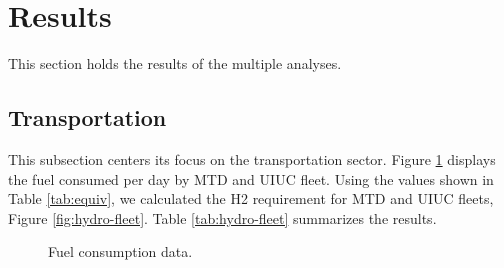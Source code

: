 \section{Results}
\label{sec:Results}

This section holds the results of the multiple analyses.

\subsection{Transportation}

This subsection centers its focus on the transportation sector.
Figure \ref{fig:fuel} displays the fuel consumed per day by \gls{MTD} and \gls{UIUC} fleet.
Using the values shown in Table \ref{tab:equiv}, we calculated the \gls{H2} requirement for MTD and UIUC fleets, Figure \ref{fig:hydro-fleet}.
Table \ref{tab:hydro-fleet} summarizes the results.

	\begin{figure}[htbp!]
		\centering
		\hfill
		\caption{Fuel consumption data.}
		\label{fig:fuel}
	\end{figure}

